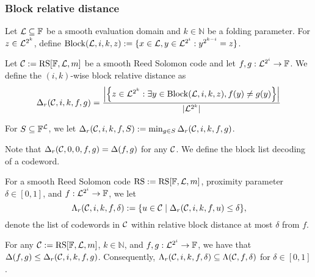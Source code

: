 \subsubsection{Block relative distance}

\begin{definition}\label{def:block}
    Let $\mathcal{L} \subseteq \mathbb{F}$ be a smooth evaluation domain and $k \in \mathbb{N}$ be a folding parameter. For $z \in \mathcal{L}^{2^k}$, define $\mathrm{Block}(\mathcal{L}, i, k, z) := \{ x \in \mathcal{L}, y \in \mathcal{L}^{2^i} : y^{2^{k-i}} = z \}$.
\end{definition}

\begin{definition}\label{def:block_rel_distance}
    Let $\mathcal{C} := \mathrm{RS}[\mathbb{F}, \mathcal{L}, m]$ be a smooth Reed Solomon code and let $f, g : \mathcal{L}^{2^i} \to \mathbb{F}$. We define the $(i,k)$-wise block relative distance as
    \[
    \Delta_{r}(\mathcal{C}, i, k, f, g) = \frac{ \left| \left\{ z \in \mathcal{L}^{2^k} : \exists y \in \mathrm{Block}(\mathcal{L}, i, k, z), f(y) \neq g(y) \right\} \right| }{ |\mathcal{L}^{2^k}| }
    \]
\end{definition}

\begin{definition}\label{def:min_block_rel_distance}
    For $S \subseteq \mathbb{F}^{\mathcal{L}}$, we let $\Delta_{r}(\mathcal{C}, i, k, f, S) := \min_{g \in S} \Delta_{r}(\mathcal{C}, i, k, f, g)$.
\end{definition}

{Note that $\Delta_{r}(\mathcal{C}, 0, 0, f, g) = \Delta(f, g)$ for any $\mathcal{C}$. We define the block list decoding of a codeword.}

\begin{definition}\label{def:list_close_codewords_block}
    For a smooth Reed Solomon code $\mathrm{RS} := \mathrm{RS}[\mathbb{F}, \mathcal{L}, m]$, proximity parameter $\delta \in [0,1]$, and $f : \mathcal{L}^{2^i} \to \mathbb{F}$, we let
    \[
    \Lambda_{r}(\mathcal{C}, i, k, f, \delta) := \{ u \in \mathcal{C} \mid \Delta_{r}(\mathcal{C}, i, k, f, u) \leq \delta \},
    \]
    denote the list of codewords in $\mathcal{C}$ within relative block distance at most $\delta$ from $f$.
\end{definition}

\begin{lemma}\label{lemma:block_rel_distance}
    For any $\mathcal{C} := \mathrm{RS}[\mathbb{F}, \mathcal{L}, m]$, $k \in \mathbb{N}$, and $f, g : \mathcal{L}^{2^i} \to \mathbb{F}$, we have that $\Delta(f, g) \leq \Delta_{r}(\mathcal{C}, i, k, f, g)$. Consequently, $\Lambda_{r}(\mathcal{C}, i, k, f, \delta) \subseteq \Lambda(\mathcal{C}, f, \delta)$ for $\delta\in[0,1]$.
\end{lemma}

